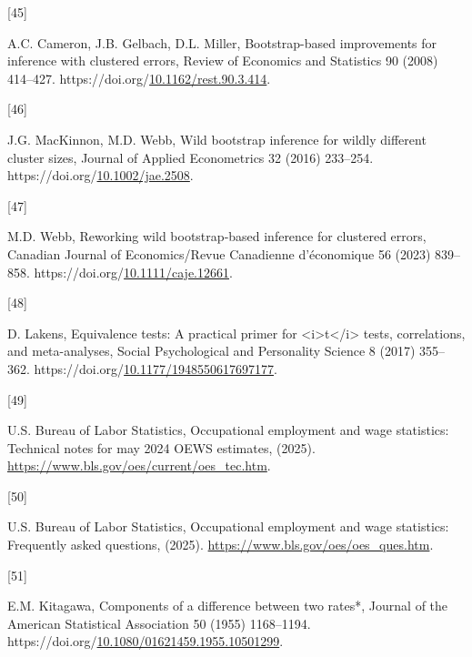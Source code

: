 \documentclass[
  11pt,
]{article}
\newlength{\cslhangindent}
\newlength{\csllabelwidth}
\newenvironment{CSLReferences}[2] %
 {\begin{list}{}{%
  \setlength{\itemindent}{0pt}
  \setlength{\leftmargin}{0pt}
  \setlength{\parsep}{0pt}
  \ifodd #1
   \setlength{\leftmargin}{\cslhangindent}
   \setlength{\itemindent}{-1\cslhangindent}
  \fi
  \setlength{\itemsep}{#2\baselineskip}}}
 {\end{list}}
\newcommand{\CSLLeftMargin}[1]{\parbox[t]{\csllabelwidth}{\strut#1\strut}}
\newcommand{\CSLRightInline}[1]{\parbox[t]{\linewidth - \csllabelwidth}{\strut#1\strut}}
\begin{document}
\begin{CSLReferences}{0}{0}
\CSLLeftMargin{{[}45{]} }%
\CSLRightInline{A.C. Cameron, J.B. Gelbach, D.L. Miller, Bootstrap-based
improvements for inference with clustered errors, Review of Economics
and Statistics 90 (2008) 414--427.
https://doi.org/\href{https://doi.org/10.1162/rest.90.3.414}{10.1162/rest.90.3.414}.}

\CSLLeftMargin{{[}46{]} }%
\CSLRightInline{J.G. MacKinnon, M.D. Webb, Wild bootstrap inference for
wildly different cluster sizes, Journal of Applied Econometrics 32
(2016) 233--254.
https://doi.org/\href{https://doi.org/10.1002/jae.2508}{10.1002/jae.2508}.}

\CSLLeftMargin{{[}47{]} }%
\CSLRightInline{M.D. Webb, Reworking wild bootstrap‐based inference for
clustered errors, Canadian Journal of Economics/Revue Canadienne
d'économique 56 (2023) 839--858.
https://doi.org/\href{https://doi.org/10.1111/caje.12661}{10.1111/caje.12661}.}

\CSLLeftMargin{{[}48{]} }%
\CSLRightInline{D. Lakens, Equivalence tests: A practical primer for
\textless i\textgreater t\textless/i\textgreater{} tests, correlations,
and meta-analyses, Social Psychological and Personality Science 8 (2017)
355--362.
https://doi.org/\href{https://doi.org/10.1177/1948550617697177}{10.1177/1948550617697177}.}

\CSLLeftMargin{{[}49{]} }%
\CSLRightInline{U.S. Bureau of Labor Statistics, Occupational employment
and wage statistics: Technical notes for may 2024 OEWS estimates,
(2025). \url{https://www.bls.gov/oes/current/oes_tec.htm}.}

\CSLLeftMargin{{[}50{]} }%
\CSLRightInline{U.S. Bureau of Labor Statistics, Occupational employment
and wage statistics: Frequently asked questions, (2025).
\url{https://www.bls.gov/oes/oes_ques.htm}.}

\CSLLeftMargin{{[}51{]} }%
\CSLRightInline{E.M. Kitagawa, Components of a difference between two
rates*, Journal of the American Statistical Association 50 (1955)
1168--1194.
https://doi.org/\href{https://doi.org/10.1080/01621459.1955.10501299}{10.1080/01621459.1955.10501299}.}

\end{CSLReferences}

\newpage
\end{document}
